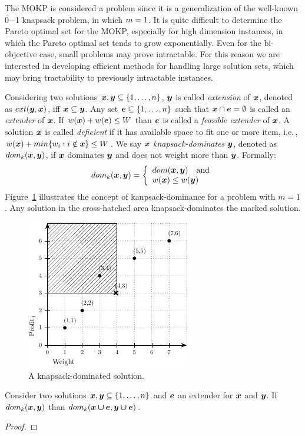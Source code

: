 The MOKP is considered a \nphard{} problem since it is a generalization
of the well-known 0$-$1 knapsack problem, in which $m = 1$.
It is quite difficult to determine the Pareto optimal set for the MOKP,
especially for high dimension instances, in which the
Pareto optimal set tends to grow exponentially.
Even for the bi-objective case, small problems may prove intractable.
For this reason we are interested in developing efficient methods for
handling large solution sets, which may bring tractability to previously
intractable instances.

Considering two solutions $\boldsymbol{x}, \boldsymbol{y} \subseteq \{1, \ldots, n\}$, $\boldsymbol{y}$ is
called \emph{extension} of $\boldsymbol{x}$, denoted as $ext(\boldsymbol{y}, \boldsymbol{x})$,
iff $\boldsymbol{x} \subseteq \boldsymbol{y}$.
Any set $\boldsymbol{e} \subseteq \{1, \ldots, n\}$ such that $\boldsymbol{x} \cap \boldsymbol{e} = \emptyset$
is called an \emph{extender} of $\boldsymbol{x}$.
If $w(\boldsymbol{x}) + w(\boldsymbol{e}) \leq W$ than $\boldsymbol{e}$ is called a
\emph{feasible extender} of $\boldsymbol{x}$.
A solution $\boldsymbol{x}$ is called \emph{deficient} if it has available space
to fit one or more item, i.e.\,, $w(\boldsymbol{x}) + min\{ w_i : i \notin \boldsymbol{x} \} \leq W$.
We say
$\boldsymbol{x}$ \emph{knapsack-dominates} $\boldsymbol{y}$, denoted as $dom_k(\boldsymbol{x}, \boldsymbol{y})$,
if $\boldsymbol{x}$ dominates $\boldsymbol{y}$ and does not weight more than $\boldsymbol{y}$.
Formally:
\begin{displaymath}
  dom_k(\boldsymbol{x}, \boldsymbol{y}) = \left\{
    \begin{array}{l}
      dom(\boldsymbol{x}, \boldsymbol{y}) \quad \text{and} \\
      w(\boldsymbol{x}) \leq w(\boldsymbol{y})
    \end{array}
  \right.
\end{displaymath}
Figure~\ref{fig:kdom} illustrates the concept of kanpsack-dominance for a
problem with $m = 1$.
Any solution in the cross-hatched area knapsack-dominates the marked solution.
\begin{figure}
  \includegraphics[scale=5.0]{src/imgs/dom}
  \caption{A knapsack-dominated solution.}
  \label{fig:kdom}
\end{figure}

\begin{theorem}
  Consider two solutions $\boldsymbol{x}, \boldsymbol{y} \subseteq \{1, \ldots, n\}$
  and $\boldsymbol{e}$ an extender for $\boldsymbol{x}$ and $\boldsymbol{y}$.
  If $dom_k(\boldsymbol{x}, \boldsymbol{y})$ than $dom_k(\boldsymbol{x \cup e}, \boldsymbol{y \cup e})$.
\end{theorem}
\begin{proof}

\end{proof}


